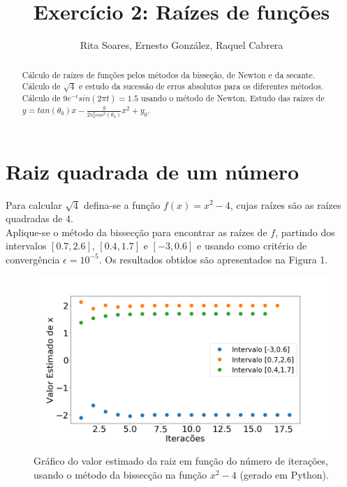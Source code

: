 \documentclass[aps,pre,twocolumn,showpacs,amsmath,amssymb]{revtex4-1}
\begin{document}
\title{Exercício 2: Raízes de funções}

\author{Rita Soares, Ernesto González, Raquel Cabrera}

\begin{abstract}
  Cálculo de raízes de funções pelos métodos da bisseção, de Newton e da secante. Cálculo de $\sqrt{4}$ e estudo da sucessão de erros absolutos para os diferentes métodos. Cálculo de $9e^{-t}sin(2\pi t)=1.5$ usando o método de Newton. Estudo das raízes de $y=tan(\theta_0)x-\frac{g}{2v_{0}^{2}cos^2(\theta_0)}x^2+y_0$.
\end{abstract}

\maketitle

\section{Raiz quadrada de um número}

Para calcular $\sqrt{4}$ defina-se a função $f(x)=x^2-4$, cujas raízes são as
raízes quadradas de $4$. \\
Aplique-se o método da bissecção para encontrar as raízes de $f$, partindo dos
intervalos $[0.7,2.6]$, $[0.4,1.7]$ e $[-3,0.6]$ e usando como critério de
convergência $\epsilon = 10^{-5}$. Os resultados obtidos são apresentados na
Figura 1.

\begin{figure}[h]\vspace{-2ex}
   \begin{center}
    \includegraphics[width=\columnwidth]{Figure_1.png} \\
\caption{Gráfico do valor estimado da raiz em função do número de iterações, usando o método da bissecção na função $x^2-4$ (gerado em Python).}
  \label{fig.exemplo}
   \end{center}
\end{figure}
\end{document}
